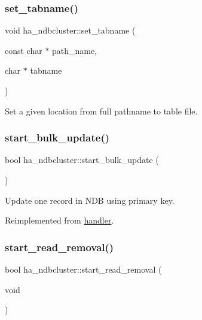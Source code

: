 \subsubsection{\texorpdfstring{set\+\_\+tabname()}{set\_tabname()}}
{\footnotesize\ttfamily void ha\+\_\+ndbcluster\+::set\+\_\+tabname (\begin{DoxyParamCaption}\item[{const char $\ast$}]{path\+\_\+name,  }\item[{char $\ast$}]{tabname }\end{DoxyParamCaption})\hspace{0.3cm}{\ttfamily [static]}}

Set a given location from full pathname to table file. \mbox{\label{classha__ndbcluster_aa852a48bce2fe6fbbe70b83022d74ed2}} 
\subsubsection{\texorpdfstring{start\+\_\+bulk\+\_\+update()}{start\_bulk\_update()}}
{\footnotesize\ttfamily bool ha\+\_\+ndbcluster\+::start\+\_\+bulk\+\_\+update (\begin{DoxyParamCaption}{ }\end{DoxyParamCaption})\hspace{0.3cm}{\ttfamily [virtual]}}

Update one record in N\+DB using primary key. 

Reimplemented from \mbox{\hyperlink{classhandler_a7488245f51aa4676c872bb0564dbe71f}{handler}}.

\mbox{\label{classha__ndbcluster_a55b76e2e6595d838981a54951aa3f002}} 
\subsubsection{\texorpdfstring{start\+\_\+read\+\_\+removal()}{start\_read\_removal()}}
{\footnotesize\ttfamily bool ha\+\_\+ndbcluster\+::start\+\_\+read\+\_\+removal (\begin{DoxyParamCaption}\item[{void}]{ }\end{DoxyParamCaption})\hspace{0.3cm}{\ttfamily [virtual]}}

